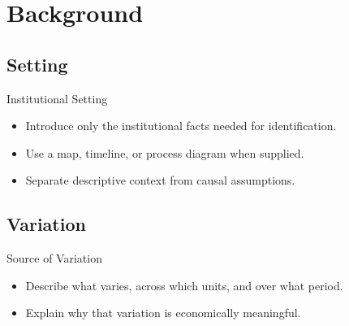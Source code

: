 \section{Background}
\subsection{Setting}

\begin{frame}{Institutional Setting}
  \begin{itemize}
    \item Introduce only the institutional facts needed for identification.
    \item Use a map, timeline, or process diagram when supplied.
    \item Separate descriptive context from causal assumptions.
  \end{itemize}
\end{frame}

\subsection{Variation}

\begin{frame}{Source of Variation}
  \begin{itemize}
    \item Describe what varies, across which units, and over what period.
    \item Explain why that variation is economically meaningful.
  \end{itemize}
\end{frame}
